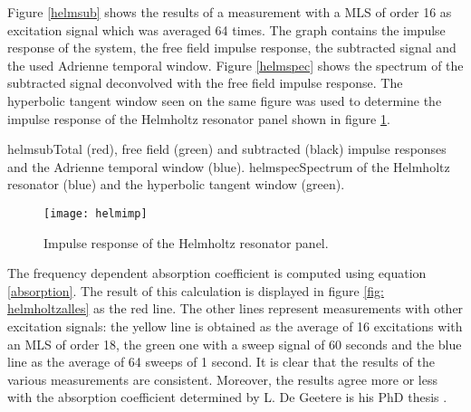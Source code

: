 Figure \ref{helmsub} shows the results of a measurement with a MLS of order 16 as excitation signal which was averaged 64 times. The graph 
 contains the impulse response of the system, the free field impulse response, the subtracted signal and the used Adrienne temporal window. Figure \ref{helmspec} shows the spectrum of the subtracted signal deconvolved with the free field impulse response. The hyperbolic tangent window seen on the same figure was used to determine the impulse response of the Helmholtz resonator panel shown in figure \ref{fig: helmimp}.
 
  

	{helmsub}{Total (red), free field (green) and subtracted (black) impulse responses and the Adrienne temporal window (blue).}
	{helmspec}{Spectrum of the Helmholtz resonator (blue) and the hyperbolic tangent window (green).}


\begin{figure}[h!]
  \centering
    \texttt{[image: helmimp]}
  \caption{Impulse response of the Helmholtz resonator panel.}
  \label{fig: helmimp}
\end{figure}

The frequency dependent absorption coefficient is computed using equation \ref{absorption}. The result of this calculation is displayed in figure \ref{fig: helmholtzalles} as the red line. The other lines represent measurements with other excitation signals: the yellow line is obtained as the average of 16 excitations with an MLS of order 18, the green one with a sweep signal of 60 seconds and the blue line as the average of 64 sweeps of 1 second. It is clear that the results of the various measurements are consistent. Moreover, the results agree more or less with the absorption coefficient determined by L. De Geetere is his PhD thesis \cite[p.84]{Geetere}. 

